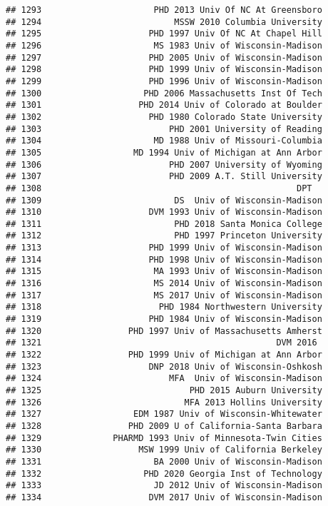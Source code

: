 \documentclass[
]{article}
\begin{document}
\begin{verbatim}
## 1293                      PHD 2013 Univ Of NC At Greensboro
## 1294                          MSSW 2010 Columbia University
## 1295                     PHD 1997 Univ Of NC At Chapel Hill
## 1296                      MS 1983 Univ of Wisconsin-Madison
## 1297                     PHD 2005 Univ of Wisconsin-Madison
## 1298                     PHD 1999 Univ of Wisconsin-Madison
## 1299                     PHD 1996 Univ of Wisconsin-Madison
## 1300                    PHD 2006 Massachusetts Inst Of Tech
## 1301                   PHD 2014 Univ of Colorado at Boulder
## 1302                     PHD 1980 Colorado State University
## 1303                         PHD 2001 University of Reading
## 1304                      MD 1988 Univ of Missouri-Columbia
## 1305                  MD 1994 Univ of Michigan at Ann Arbor
## 1306                         PHD 2007 University of Wyoming
## 1307                         PHD 2009 A.T. Still University
## 1308                                                  DPT  
## 1309                          DS  Univ of Wisconsin-Madison
## 1310                     DVM 1993 Univ of Wisconsin-Madison
## 1311                          PHD 2018 Santa Monica College
## 1312                          PHD 1997 Princeton University
## 1313                     PHD 1999 Univ of Wisconsin-Madison
## 1314                     PHD 1998 Univ of Wisconsin-Madison
## 1315                      MA 1993 Univ of Wisconsin-Madison
## 1316                      MS 2014 Univ of Wisconsin-Madison
## 1317                      MS 2017 Univ of Wisconsin-Madison
## 1318                       PHD 1984 Northwestern University
## 1319                     PHD 1984 Univ of Wisconsin-Madison
## 1320                 PHD 1997 Univ of Massachusetts Amherst
## 1321                                              DVM 2016 
## 1322                 PHD 1999 Univ of Michigan at Ann Arbor
## 1323                     DNP 2018 Univ of Wisconsin-Oshkosh
## 1324                         MFA  Univ of Wisconsin-Madison
## 1325                             PHD 2015 Auburn University
## 1326                            MFA 2013 Hollins University
## 1327                  EDM 1987 Univ of Wisconsin-Whitewater
## 1328                 PHD 2009 U of California-Santa Barbara
## 1329              PHARMD 1993 Univ of Minnesota-Twin Cities
## 1330                   MSW 1999 Univ of California Berkeley
## 1331                      BA 2000 Univ of Wisconsin-Madison
## 1332                    PHD 2020 Georgia Inst of Technology
## 1333                      JD 2012 Univ of Wisconsin-Madison
## 1334                     DVM 2017 Univ of Wisconsin-Madison

\end{verbatim}
\end{document}
